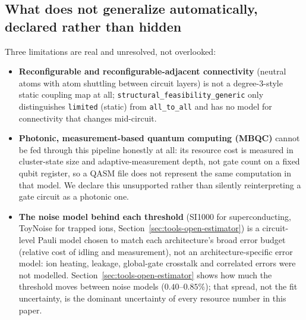 \documentclass[9pt,twocolumn]{extarticle}
\begin{document}
\subsection{What does not generalize automatically, declared rather than hidden}
Three limitations are real and unresolved, not overlooked:
\begin{itemize}
\item \textbf{Reconfigurable and reconfigurable-adjacent connectivity}
(neutral atoms with atom shuttling between circuit layers) is not a
degree-3-style static coupling map at all; \texttt{structural\_feasibility\_generic}
only distinguishes \texttt{limited} (static) from \texttt{all\_to\_all} and has no
model for connectivity that changes mid-circuit.
\item \textbf{Photonic, measurement-based quantum computing (MBQC)} cannot be
fed through this pipeline honestly at all: its resource cost is measured in
cluster-state size and adaptive-measurement depth, not gate count on a
fixed qubit register, so a QASM file does not represent the same
computation in that model. We declare this unsupported rather than
silently reinterpreting a gate circuit as a photonic one.
\item \textbf{The noise model behind each threshold} (SI1000 for
superconducting, ToyNoise for trapped ions, Section~\ref{sec:tools-open-estimator})
is a circuit-level Pauli model chosen to match each architecture's broad
error budget (relative cost of idling and measurement), not an
architecture-specific error model: ion heating, leakage, global-gate
crosstalk and correlated errors were not modelled. Section~\ref{sec:tools-open-estimator}
shows how much the threshold moves between noise models ($0.40$--$0.85\%$);
that spread, not the fit uncertainty, is the dominant uncertainty of every
resource number in this paper.
\end{itemize}
\end{document}
